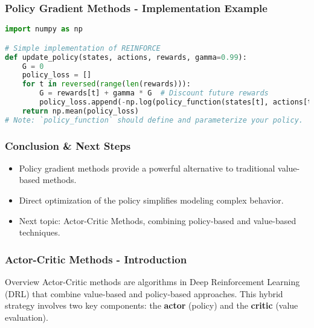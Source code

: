 \documentclass[aspectratio=169]{beamer}
\begin{document}
\begin{frame}[fragile]
    \frametitle{Policy Gradient Methods - Implementation Example}
    \begin{lstlisting}[language=Python]
import numpy as np

# Simple implementation of REINFORCE
def update_policy(states, actions, rewards, gamma=0.99):
    G = 0
    policy_loss = []
    for t in reversed(range(len(rewards))):
        G = rewards[t] + gamma * G  # Discount future rewards
        policy_loss.append(-np.log(policy_function(states[t], actions[t])) * G)
    return np.mean(policy_loss)
# Note: `policy_function` should define and parameterize your policy.
    \end{lstlisting}
\end{frame}

\begin{frame}[fragile]
    \frametitle{Conclusion & Next Steps}
    \begin{itemize}
        \item Policy gradient methods provide a powerful alternative to traditional value-based methods.
        \item Direct optimization of the policy simplifies modeling complex behavior.
        \item Next topic: Actor-Critic Methods, combining policy-based and value-based techniques.
    \end{itemize}
\end{frame}

\begin{frame}[fragile]
    \frametitle{Actor-Critic Methods - Introduction}
    \begin{block}{Overview}
        Actor-Critic methods are algorithms in Deep Reinforcement Learning (DRL) that combine value-based and policy-based approaches.
        This hybrid strategy involves two key components: the \textbf{actor} (policy) and the \textbf{critic} (value evaluation).
    \end{block}
\end{frame}
\end{document}
